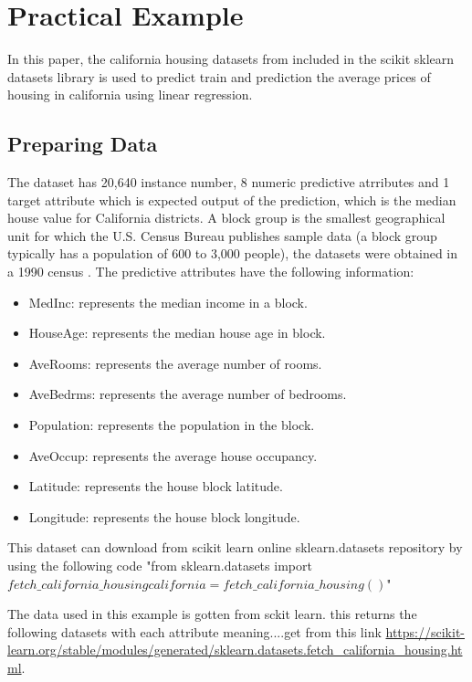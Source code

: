 \documentclass[conference]{IEEEtran}
\begin{document}
\section{Practical Example}
In this paper, the california housing datasets from \cite{KELLEYPACE1997291} included in the scikit sklearn datasets library is used to predict train and prediction the average prices of housing in california using linear regression. 
\subsection{Preparing Data}
The dataset has 20,640 instance number, 8 numeric predictive atrributes and 1 target attribute which is expected output of the prediction, which is the median house value for California districts. A block group is the smallest geographical unit for which the U.S. Census Bureau publishes sample data (a block group typically has a population of 600 to 3,000 people), the datasets were obtained in a 1990 census \cite{KELLEYPACE1997291}.
The predictive attributes have the following information: 
	\begin{itemize}
		\item MedInc: represents the median income in a block.
		\item HouseAge: represents the median house age in block.
        		\item AveRooms: represents the average number of rooms.
        		\item AveBedrms: represents the average number of bedrooms.
        		\item Population: represents the population in the block.
        		\item AveOccup: represents the average house occupancy.
	        \item Latitude: represents the house block latitude.
        		\item Longitude: represents the house block longitude.
	\end{itemize}
	This dataset can download from scikit learn online sklearn.datasets repository by using the following code "from sklearn.datasets import $fetch\_california\_housing 
california = fetch\_california\_housing()$"


The data used in this example is gotten from sckit learn. this returns the following datasets with each attribute meaning....get from this link \url{https://scikit-learn.org/stable/modules/generated/sklearn.datasets.fetch_california_housing.html}.
\end{document}
